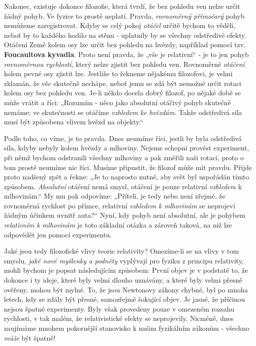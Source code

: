     Nakonec, existuje dokonce filozofie, která tvrdí, že bez pohledu ven nelze určit žádný pohyb. 
    Ve fyzice to prostě neplatí. Pravda, \emph{rovnoměrný přímočarý} pohyb nemůžeme zaregistrovat. 
    Kdyby se celý pokoj \emph{otáčel} určitě bychom to věděli, neboť by to každého hodilo na stěnu 
    - uplatnily by se všechny odstředivé efekty. Otáčení Země kolem osy lze určit bez pohledu na 
    hvězdy, například pomocí tzv. \textbf{Foucaultova kyvadla}. Proto není pravda, že „vše je 
    relativní“ - je to jen pohyb \emph{rovnoměrnou rychlostí}, který nelze zjistit bez pohledu ven. 
    Rovnoměrné \emph{otáčení} kolem pevné osy zjistit lze. Jestliže to řekneme nějakému filozofovi, 
    je velmi zklamán, že věc skutečně nechápe, neboť jemu se zdá být nemožné určit rotaci kolem osy 
    bez pohledu ven. Je-li někdo docela dobrý filozof, po nějaké době se může vrátit a říci: 
    „Rozumím - něco jako absolutní otáčivý pohyb skutečně nemáme; ve skutečnosti se otáčíme 
    \emph{vzhledem ke hvězdám}. Takže odstředivá síla musí být způsobena vlivem hvězd na objekty.“
    
    Podle toho, co víme, je to pravda. Dnes neumíme říci, jestli by byla odstředivá síla, kdyby 
    nebyly kolem hvězdy a mlhoviny. Nejsme schopni provést experiment, při němž bychom odstranili 
    všechny mlhoviny a pak změřili naši rotaci, proto o tom prostě neumíme nic říci. Musíme 
    připustit, že filozof může mít pravdu. Přijde proto nadšený zpět a řekne: „Je to naprosto 
    nutné, aby svět byl uspořádán tímto způsobem. \emph{Absolutní} otáčení nemá smysl, otáčení je 
    pouze relativní \emph{vzhledem} k mlhovinám.“ My mu pak odpovíme: „Příteli, je tedy nebo není 
    zřejmé, že rovnoměrná rychlost po přímce, relativní \emph{vzhledem k mlhovinám} se neprojeví 
    žádným účinkem uvnitř auta?“ Nyní, kdy pohyb není absolutní, ale je pohybem \emph{relativním k 
    mlhovinám} je toto základní otázka a zároveň taková, na niž lze odpovědět jen pomocí 
    experimentu.
    
    Jaké jsou tedy filozofické vlivy teorie relativity? Omezíme-li se na vlivy v tom smyslu, 
    \emph{jaké nové myšlenky a podněty} vyplývají pro fyziku z principu relativity, mohli bychom je 
    popsat následujícím způsobem: První objev je v podstatě to, že dokonce i ty ideje, které byly 
    velmi dlouho uznávány, a které byly velmi přesně ověřeny, mohou být mylné. To, že jsou 
    Newtonovy zákony chybné, byl po mnoha letech, kdy se zdály být přesné, samozřejmě šokující 
    objev. Je jasné, že příčinou nejsou špatné experimenty. Byly však provedeny pouze v omezeném 
    rozsahu rychlosti, v tak malém, že relativistické efekty se neprojevily. Nicméně, dnes 
    zaujímáme mnohem pokornější stanovisko k našim fyzikálním zákonům - všechno \emph{může} být 
    špatně!
    
